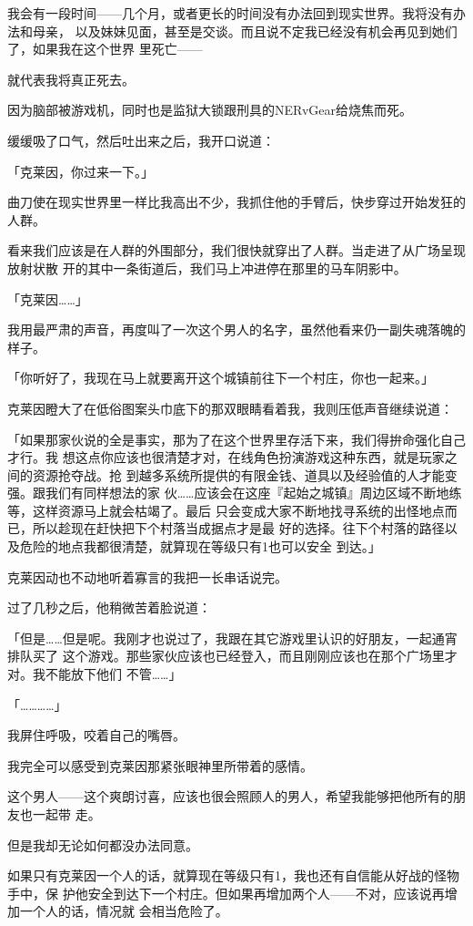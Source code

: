 \documentclass[11pt]{book}
\begin{document}
我会有一段时间——几个月，或者更长的时间没有办法回到现实世界。我将没有办法和母亲，
以及妹妹见面，甚至是交谈。而且说不定我已经没有机会再见到她们了，如果我在这个世界
里死亡——

就代表我将真正死去。

因为脑部被游戏机，同时也是监狱大锁跟刑具的NERvGear给烧焦而死。

缓缓吸了口气，然后吐出来之后，我开口说道：

「克莱因，你过来一下。」

曲刀使在现实世界里一样比我高出不少，我抓住他的手臂后，快步穿过开始发狂的人群。

看来我们应该是在人群的外围部分，我们很快就穿出了人群。当走进了从广场呈现放射状散
开的其中一条街道后，我们马上冲进停在那里的马车阴影中。

「克莱因……」

我用最严肃的声音，再度叫了一次这个男人的名字，虽然他看来仍一副失魂落魄的样子。

「你听好了，我现在马上就要离开这个城镇前往下一个村庄，你也一起来。」

克莱因瞪大了在低俗图案头巾底下的那双眼睛看着我，我则压低声音继续说道：

「如果那家伙说的全是事实，那为了在这个世界里存活下来，我们得拚命强化自己才行。我
想这点你应该也很清楚才对，在线角色扮演游戏这种东西，就是玩家之间的资源抢夺战。抢
到越多系统所提供的有限金钱、道具以及经验值的人才能变强。跟我们有同样想法的家
伙……应该会在这座『起始之城镇』周边区域不断地练等，这样资源马上就会枯竭了。最后
只会变成大家不断地找寻系统的出怪地点而已，所以趁现在赶快把下个村落当成据点才是最
好的选择。往下个村落的路径以及危险的地点我都很清楚，就算现在等级只有1也可以安全
到达。」

克莱因动也不动地听着寡言的我把一长串话说完。

过了几秒之后，他稍微苦着脸说道：

「但是……但是呢。我刚才也说过了，我跟在其它游戏里认识的好朋友，一起通宵排队买了
这个游戏。那些家伙应该也已经登入，而且刚刚应该也在那个广场里才对。我不能放下他们
不管……」

「…………」

我屏住呼吸，咬着自己的嘴唇。

我完全可以感受到克莱因那紧张眼神里所带着的感情。

这个男人——这个爽朗讨喜，应该也很会照顾人的男人，希望我能够把他所有的朋友也一起带
走。

但是我却无论如何都没办法同意。

如果只有克莱因一个人的话，就算现在等级只有1，我也还有自信能从好战的怪物手中，保
护他安全到达下一个村庄。但如果再增加两个人——不对，应该说再增加一个人的话，情况就
会相当危险了。
\end{document}

